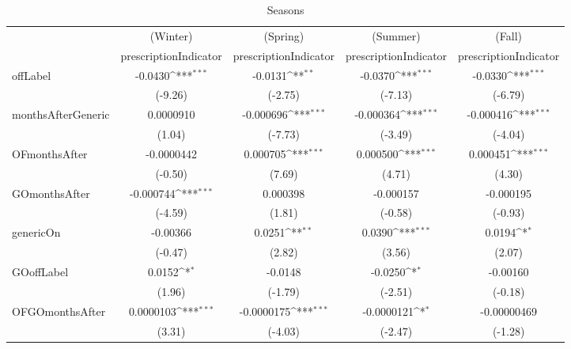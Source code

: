 \begin{table}[htbp]\centering
\def\sym#1{\ifmmode^{#1}\else\(^{#1}\)\fi}
\caption{Seasons\label{tab1}}
\begin{tabular}{l*{4}{c}}
\hline\hline
            &\multicolumn{1}{c}{(Winter)}&\multicolumn{1}{c}{(Spring)}&\multicolumn{1}{c}{(Summer)}&\multicolumn{1}{c}{(Fall)}\\
            &\multicolumn{1}{c}{prescriptionIndicator}&\multicolumn{1}{c}{prescriptionIndicator}&\multicolumn{1}{c}{prescriptionIndicator}&\multicolumn{1}{c}{prescriptionIndicator}\\
\hline
offLabel    &     -0.0430\sym{***}&     -0.0131\sym{**} &     -0.0370\sym{***}&     -0.0330\sym{***}\\
            &     (-9.26)         &     (-2.75)         &     (-7.13)         &     (-6.79)         \\
[1em]
monthsAfterGeneric&   0.0000910         &   -0.000696\sym{***}&   -0.000364\sym{***}&   -0.000416\sym{***}\\
            &      (1.04)         &     (-7.73)         &     (-3.49)         &     (-4.04)         \\
[1em]
OFmonthsAfter&  -0.0000442         &    0.000705\sym{***}&    0.000500\sym{***}&    0.000451\sym{***}\\
            &     (-0.50)         &      (7.69)         &      (4.71)         &      (4.30)         \\
[1em]
GOmonthsAfter&   -0.000744\sym{***}&    0.000398         &   -0.000157         &   -0.000195         \\
            &     (-4.59)         &      (1.81)         &     (-0.58)         &     (-0.93)         \\
[1em]
genericOn   &    -0.00366         &      0.0251\sym{**} &      0.0390\sym{***}&      0.0194\sym{*}  \\
            &     (-0.47)         &      (2.82)         &      (3.56)         &      (2.07)         \\
[1em]
GOoffLabel  &      0.0152\sym{*}  &     -0.0148         &     -0.0250\sym{*}  &    -0.00160         \\
            &      (1.96)         &     (-1.79)         &     (-2.51)         &     (-0.18)         \\
[1em]
OFGOmonthsAfter&   0.0000103\sym{***}&  -0.0000175\sym{***}&  -0.0000121\sym{*}  & -0.00000469         \\
            &      (3.31)         &     (-4.03)         &     (-2.47)         &     (-1.28)         \\

\end{tabular}
\end{table}

